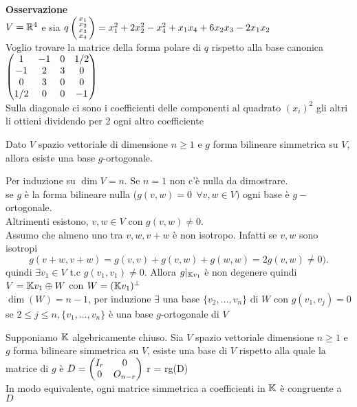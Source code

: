 \documentclass[12px]{article}
\begin{document}
	 \textbf{Osservazione}\\
	 $V=\mathbb{R}^4$ e sia $q\left(\begin{smallmatrix}x_1\\x_2\\x_3\\x_4\end{smallmatrix}\right)= x_1^2+2x_2^2-x_4^2+x_1x_4+6x_2x_3-2x_1x_2$\\
	 Voglio trovare la matrice della forma polare di $q$ rispetto  alla base canonica\\
	 $\begin{pmatrix}1&-1&0&1/2\\-1&2&3&0\\0&3&0&0\\1/2&0&0&-1\end{pmatrix}$\\
	 Sulla diagonale ci sono i coefficienti delle componenti al quadrato  $(x_i)^2$ gli altri li ottieni dividendo per 2 ogni altro coefficiente 
	\\
	\begin{teo}
		Dato $V$ spazio vettoriale di dimensione $n\geq 1$ e  $g$ forma bilineare simmetrica su $V $, allora esiste una base $g$-ortogonale.
	\end{teo}
	\begin{dimo}
		Per induzione su $\dim V = n$. Se  $n=1$ non c'è nulla da dimostrare.\\
		se $g$ è la forma bilineare nulla ($g(v,w)=0 \ \ \forall v,w\in V)$ ogni base è  $g-$ortogonale.\\
		Altrimenti esistono,  $v,w\in V$ con $g(v,w)\neq 0$.\\
		Assumo che almeno uno tra  $v,w,v+w$ è non isotropo. Infatti se $v,w$ sono isotropi
		\[
		g(v+w,v+w)=g(v,v) + g(v,w) + g(w,w) = 2g(v,w)\neq 0)
		.\] 
		quindi $\exists v_1\in V$ t.c $g(v_1,v_1)\neq 0$. Allora $g|_{\mathbb{K} v_1}$ è non degenere quindi $V = \mathbb{K} v_1\oplus W$ con $W = (\mathbb{K} v_1)^\perp$ \\
		$\dim(W) = n-1$, per induzione $\exists$ una base  $\{v_2,\ldots,v_n\}$ di $W$ con $g(v_1,v_j) = 0$ se $2\leq j\leq n, \{v_1,\ldots,v_n\}$ è una base $g$-ortogonale di $V$
	\end{dimo}
	\begin{teo}
		Supponiamo $\mathbb{K}$ algebricamente chiuso. Sia $V$ spazio vettoriale dimensione $n\geq 1$ e $g$ forma bilineare simmetrica su $V$, esiste una base di $V$ rispetto alla quale la matrice di $g$ è $D=\begin{pmatrix}I_r&0\\0&O_{n-r}\end{pmatrix}$ r = rg(D)\\
In modo equivalente, ogni matrice simmetrica a coefficienti in  $\mathbb{K}$ è congruente a $D$
	\end{teo}
\end{document}
